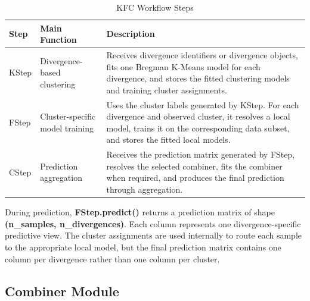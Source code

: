 \begin{table}[H]
      \centering
      \caption{KFC Workflow Steps}
      \label{tab:kfc_workflow_steps}
      \renewcommand{\arraystretch}{1.2}
      \begin{tabularx}{\textwidth}{
                  >{\raggedright\arraybackslash}p{2.5cm}
                  >{\raggedright\arraybackslash}p{3.3cm}
                  >{\raggedright\arraybackslash}X
            }
            \toprule
            \textbf{Step}                   & \textbf{Main Function} & \textbf{Description}                                                                                                                  \\
            \midrule
            KStep                           &
            Divergence-based clustering     &
            Receives divergence identifiers or divergence objects, fits one Bregman K-Means model for each divergence, and stores the fitted clustering models and training cluster assignments.             \\

            FStep                           &
            Cluster-specific model training &
            Uses the cluster labels generated by KStep. For each divergence and observed cluster, it resolves a local model, trains it on the corresponding data subset, and stores the fitted local models. \\

            CStep                           &
            Prediction aggregation          &
            Receives the prediction matrix generated by FStep, resolves the selected combiner, fits the combiner when required, and produces the final prediction through aggregation.                       \\
            \bottomrule
      \end{tabularx}
\end{table}

During prediction, \textbf{FStep.predict()} returns a prediction matrix of shape \textbf{(n\_samples, n\_divergences)}. Each column represents one divergence-specific predictive view. The cluster assignments are used internally to route each sample to the appropriate local model, but the final prediction matrix contains one column per divergence rather than one column per cluster.

\subsection{Combiner Module}

